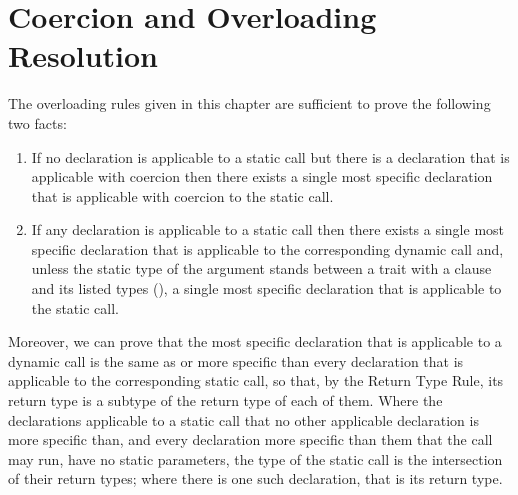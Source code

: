 \section{Coercion and Overloading Resolution}

The overloading rules given in this chapter are
sufficient to prove the following two facts:
\begin{enumerate}
\item
If no declaration is applicable to a static call but there is a
declaration that is applicable with coercion then there exists a
single most specific declaration that is applicable with coercion to
the static call.
\item
If any declaration is applicable to a static call then there exists a
single most specific declaration that is applicable to the
corresponding dynamic call and, unless the static type of the argument
stands between a trait with a  clause and its listed types
(), a single most specific declaration that is
applicable to the static call.
\end{enumerate}

Moreover, we can prove that the most specific declaration that is
applicable to a dynamic call is the same as or more specific than every
declaration that is applicable to the corresponding static call, so that, by
the Return Type Rule, its return type is a subtype of the return type of each
of them.
Where the declarations applicable to a static call that no other applicable
declaration is more specific than, and every declaration more specific than them
that the call may run, have no static parameters, the type of the static call is
the intersection of their return types; where there is one such declaration,
that is its return type.

